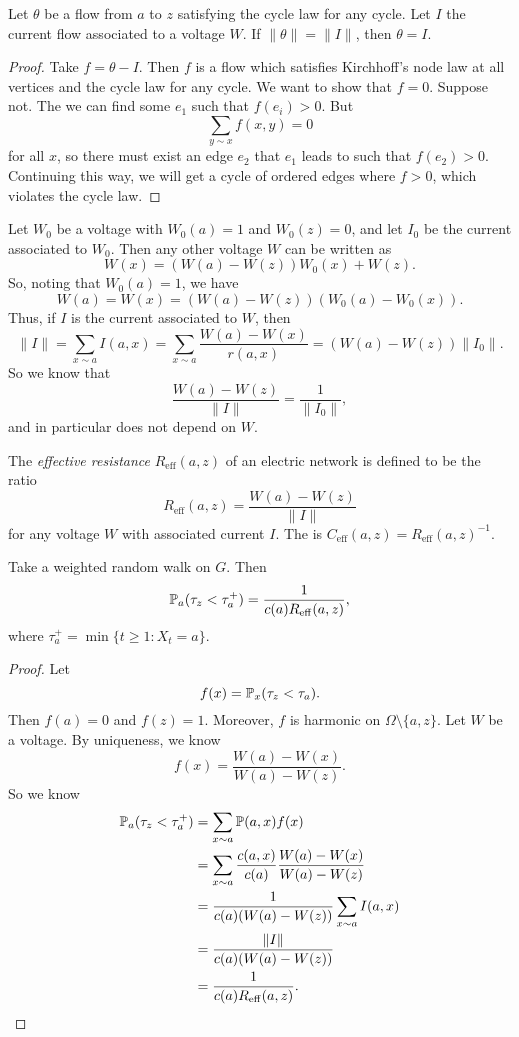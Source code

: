 \documentclass[a4paper]{article}
\begin{document}
\begin{prop}
  Let $\theta$ be a flow from $a$ to $z$ satisfying the cycle law for any cycle. Let $I$ the current flow associated to a voltage $W$. If $\|\theta\| = \|I\|$, then $\theta = I$.
\end{prop}

\begin{proof}
  Take $f = \theta - I$. Then $f$ is a flow which satisfies Kirchhoff's node law at all vertices and the cycle law for any cycle. We want to show that $f = 0$. Suppose not. The we can find some $e_1$ such that $f(e_i) > 0$. But
  \[
    \sum_{y\sim x} f(x, y) = 0
  \]
  for all $x$, so there must exist an edge $e_2$ that $e_1$ leads to such that $f(e_2) > 0$. Continuing this way, we will get a cycle of ordered edges where $f > 0$, which violates the cycle law.
\end{proof}
Let $W_0$ be a voltage with $W_0(a) = 1$ and $W_0(z) = 0$, and let $I_0$ be the current associated to $W_0$. Then any other voltage $W$ can be written as
\[
  W(x) = (W(a) - W(z)) W_0(x) + W(z).
\]
So, noting that $W_0(a) = 1$, we have
\[
  W(a) = W(x) = (W(a) - W(z))(W_0(a) - W_0(x)).
\]
Thus, if $I$ is the current associated to $W$, then
\[
  \|I\| = \sum_{x \sim a} I(a, x) = \sum_{x \sim a} \frac{W(a) - W(x)}{r(a, x)} = (W(a) - W(z)) \|I_0\|.
\]
So we know that
\[
  \frac{W(a) - W(z)}{\|I\|} = \frac{1}{\|I_0\|},
\]
and in particular does not depend on $W$.

\begin{defi}
  The \emph{effective resistance} $R_{\mathrm{eff}}(a, z)$ of an electric network is defined to be the ratio
  \[
    R_{\mathrm{eff}}(a, z) = \frac{W(a) - W(z)}{\|I\|}
  \]
  for any voltage $W$ with associated current $I$. The  is $C_{\mathrm{eff}}(a, z) = R_{\mathrm{eff}}(a, z)^{-1}$.
\end{defi}

\begin{prop}
  Take a weighted random walk on $G$. Then
  \[
    \P_a(\tau_z < \tau_a^+) = \frac{1}{c(a) R_{\mathrm{eff}}(a, z)},
  \]
  where $\tau_a^+ = \min \{t \geq 1: X_t = a\}$.
\end{prop}

\begin{proof}
  Let
  \[
    f(x) = \P_x(\tau_z < \tau_a).
  \]
  Then $f(a) = 0$ and $f(z) = 1$. Moreover, $f$ is harmonic on $\Omega \setminus \{a, z\}$. Let $W$ be a voltage. By uniqueness, we know
  \[
    f(x) = \frac{W(a) - W(x)}{W(a) - W(z)}.
  \]
  So we know
  \begin{align*}
    \P_a(\tau_z < \tau_a^+) &= \sum_{x \sim a} \P(a, x) f(x) \\
    &= \sum_{x \sim a} \frac{c(a, x)}{c(a)} \frac{W(a) - W(x)}{W(a) - W(z)}\\
    &= \frac{1}{c(a) (W(a) - W(z))} \sum_{x \sim a}I(a, x)\\
    &= \frac{\|I\|}{c(a) (W(a) - W(z))}\\
    &= \frac{1}{c(a) R_{\mathrm{eff}}(a, z)}.\qedhere
  \end{align*}
\end{proof}
\end{document}
